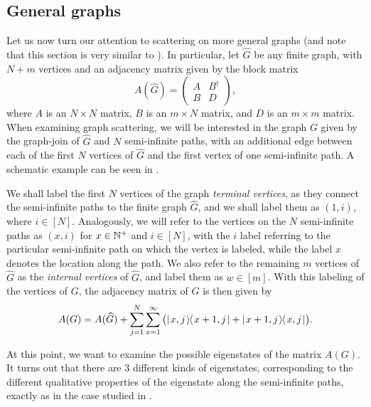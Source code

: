 \documentclass[../thesis-main/thesis-main]{subfiles}
\begin{document}
\subsection{General graphs}\label{sec:general_graphs}

Let us now turn our attention to scattering on more general graphs (and note that this section is very similar to \cite{CG12}).  In particular, let $\widehat{G}$ be any finite graph, with $N+m$ vertices and an adjacency matrix given by the block matrix
\begin{equation}
  A(\widehat{G}) = \begin{pmatrix}A & B^\dag\\ B & D\end{pmatrix},
\end{equation}
where $A$ is an $N\times N$ matrix, $B$ is an $m\times N$ matrix, and $D$ is an $m\times m$ matrix.  When examining graph scattering, we will be interested in the graph $G$ given by the graph-join of $\widehat{G}$ and $N$ semi-infinite paths, with an additional edge between each of the first $N$ vertices of $\widehat{G}$ and the first vertex of one semi-infinite path.  A schematic example can be seen in .

We shall label the first $N$ vertices of the graph \emph{terminal vertices}, as they connect the semi-infinite paths to the finite graph $\widehat{G}$, and we shall label them as $(1,i)$, where $i\in[N]$.  Analogously, we will refer to the vertices on the $N$ semi-infinite paths as $(x,i)$ for $x\in \mathbb{N}^+$ and $i\in[N]$, with the $i$ label referring to the particular semi-infinite path on which the vertex is labeled, while the label $x$ denotes the location along the path.  We also refer to the remaining $m$ vertices of $\widehat{G}$ as the \textit{internal vertices} of $\widehat{G}$, and label them as $w\in[m]$.  With this labeling of the vertices of $G$, the adjacency matrix of $G$ is then given by
\begin{equation}
  A(G) = A(\widehat{G}) + \sum_{j=1}^N \sum_{x=1}^\infty \big(|\mspace{2mu} x,j \mspace{2mu} \rangle\mspace{-2mu}\langle\mspace{2mu} x+1,j \mspace{2mu} | + |\mspace{2mu} x+1,j \mspace{2mu} \rangle\mspace{-2mu}\langle\mspace{2mu} x,j \mspace{2mu} |\big).
\end{equation}

At this point, we want to examine the possible eigenstates of the matrix $A(G)$.  It turns out that there are 3 different kinds of eigenstates, corresponding to the different qualitative properties of the eigenstate along the semi-infinite paths, exactly as in the case studied in .
\end{document}
